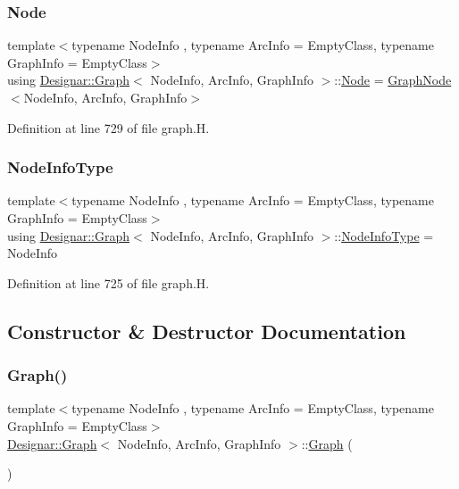 \subsubsection{\texorpdfstring{Node}{Node}}
{\footnotesize\ttfamily template$<$typename Node\+Info , typename Arc\+Info  = Empty\+Class, typename Graph\+Info  = Empty\+Class$>$ \\
using \hyperlink{class_designar_1_1_graph}{Designar\+::\+Graph}$<$ Node\+Info, Arc\+Info, Graph\+Info $>$\+::\hyperlink{class_designar_1_1_graph_a5dfc7dba9d092ac489c72e40390c37d0}{Node} =  \hyperlink{class_designar_1_1_graph_node}{Graph\+Node}$<$Node\+Info, Arc\+Info, Graph\+Info$>$}



Definition at line 729 of file graph.\+H.

\mbox{\label{class_designar_1_1_graph_a31ac58ee9562d1695e63449318577032}} 
\subsubsection{\texorpdfstring{Node\+Info\+Type}{NodeInfoType}}
{\footnotesize\ttfamily template$<$typename Node\+Info , typename Arc\+Info  = Empty\+Class, typename Graph\+Info  = Empty\+Class$>$ \\
using \hyperlink{class_designar_1_1_graph}{Designar\+::\+Graph}$<$ Node\+Info, Arc\+Info, Graph\+Info $>$\+::\hyperlink{class_designar_1_1_graph_a31ac58ee9562d1695e63449318577032}{Node\+Info\+Type} =  Node\+Info}



Definition at line 725 of file graph.\+H.



\subsection{Constructor \& Destructor Documentation}
\mbox{\label{class_designar_1_1_graph_a606f7514b8036679207da8a09ddfa6bd}} 
\subsubsection{\texorpdfstring{Graph()}{Graph()}\hspace{0.1cm}{\footnotesize\ttfamily [1/5]}}
{\footnotesize\ttfamily template$<$typename Node\+Info , typename Arc\+Info  = Empty\+Class, typename Graph\+Info  = Empty\+Class$>$ \\
\hyperlink{class_designar_1_1_graph}{Designar\+::\+Graph}$<$ Node\+Info, Arc\+Info, Graph\+Info $>$\+::\hyperlink{class_designar_1_1_graph}{Graph} (\begin{DoxyParamCaption}{ }\end{DoxyParamCaption})\hspace{0.3cm}{\ttfamily [inline]}}



